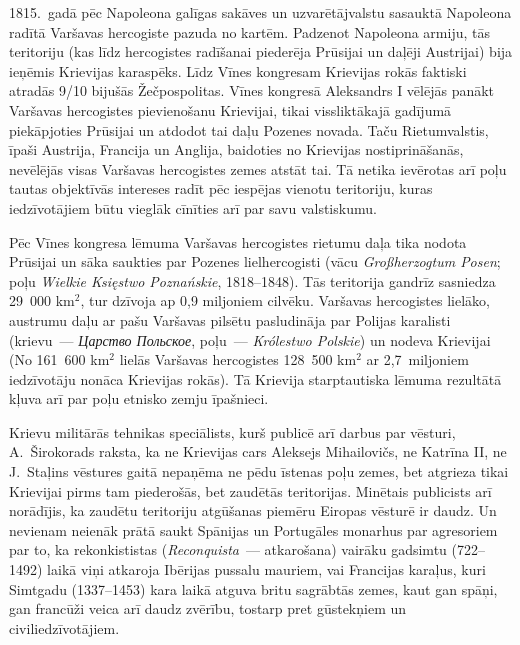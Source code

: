 \documentclass[twoside,a5paper,12pt,fleqn,openany]{extbook}
\newcommand{\asterism}{\vspace{1em}{\centering\Large\bfseries$\ast~\ast~\ast$\par}\vspace{1em}}
\newcommand{\pltxti}[1]{\textit{\textpolish{#1}}}
\newcommand{\rutxti}[1]{\textit{\textrussian{#1}}}
\newcommand{\detxti}[1]{\textit{\textgerman{#1}}}
\newcommand{\estxti}[1]{\textit{\textspanish{#1}}}
\begin{document}
\asterism



1815.~gadā pēc Napoleona galīgas sakāves un uzvarētājvalstu sasauktā  Napoleona radītā Varšavas hercogiste pazuda no kartēm. Padzenot Napoleona armiju, tās teritoriju (kas līdz hercogistes radīšanai piederēja Prūsijai un daļēji Austrijai) bija ieņēmis Krievijas karaspēks. Līdz Vīnes kongresam Krievijas rokās faktiski atradās 9/10 bijušās Žečpospolitas. Vīnes kongresā Aleksandrs I vēlējās panākt Varšavas hercogistes pievienošanu Krievijai, tikai vissliktākajā gadījumā piekāpjoties Prūsijai un atdodot tai daļu Pozenes novada. Taču Rietumvalstis, īpaši Austrija, Francija un Anglija, baidoties no Krievijas nostiprināšanās, nevēlējās visas Varšavas hercogistes zemes atstāt tai. Tā netika ievērotas arī poļu tautas objektīvās intereses radīt pēc iespējas vienotu teritoriju, kuras iedzīvotājiem būtu vieglāk cīnīties arī par savu valstiskumu.

Pēc Vīnes kongresa lēmuma Varšavas hercogistes rietumu daļa tika nodota Prūsijai un sāka saukties par Pozenes lielhercogisti (vācu \detxti{Großherzogtum Posen}; poļu \pltxti{Wielkie Księstwo Poznańskie}, 1818--1848). Tās teritorija gandrīz sasniedza 29~000 km$^{2}$, tur dzīvoja ap 0,9 miljoniem cilvēku. Varšavas hercogistes lielāko, austrumu daļu ar pašu Varšavas pilsētu pasludināja par Polijas karalisti (krievu~--- \rutxti{Царство Польское}, poļu~--- \pltxti{Królestwo Polskie}) un nodeva Krievijai (No 161~600 km$^{2}$ lielās Varšavas hercogistes 128~500 km$^{2}$ ar 2,7~miljoniem iedzīvotāju nonāca Krievijas rokās). Tā Krievija starptautiska lēmuma rezultātā kļuva arī par poļu etnisko zemju īpašnieci.

Krievu militārās tehnikas speciālists, kurš publicē arī darbus par vēsturi, A.~Širokorads raksta, ka ne Krievijas cars Aleksejs Mihailovičs, ne Katrīna II, ne J.~Staļins vēstures gaitā nepaņēma ne pēdu īstenas poļu zemes, bet atgrieza tikai Krievijai pirms tam piederošās, bet zaudētās teritorijas. Minētais publicists arī norādījis, ka zaudētu teritoriju atgūšanas piemēru Eiropas vēsturē ir daudz. Un nevienam neienāk prātā saukt Spānijas un Portugāles monarhus par agresoriem par to, ka rekonkististas (\estxti{Reconquista}~--- atkarošana) vairāku gadsimtu (722--1492) laikā viņi atkaroja Ibērijas pussalu mauriem, vai Francijas karaļus, kuri Simtgadu (1337--1453) kara laikā atguva britu sagrābtās zemes, kaut gan spāņi, gan francūži veica arī daudz zvērību, tostarp pret gūstekņiem un civiliedzīvotājiem.
\end{document}
